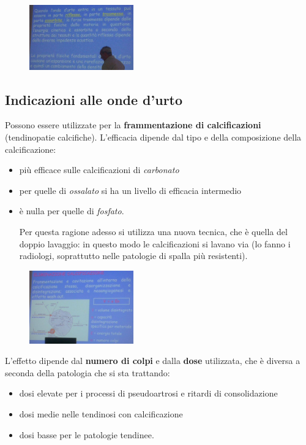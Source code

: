 \begin{figure}[!ht]
\centering
\includegraphics[width=0.4\textwidth]{025/image16.jpeg}
\end{figure}

\subsection{Indicazioni alle onde d'urto}

Possono essere utilizzate per la \textbf{frammentazione di
calcificazioni} (tendinopatie calcifiche). L'efficacia dipende dal tipo
e della composizione della calcificazione:

\begin{itemize}
\item
  più efficace sulle calcificazioni di \emph{carbonato}
\item
  per quelle di \emph{ossalato} si ha un livello di efficacia intermedio
\item
  è nulla per quelle di \emph{fosfato}.

Per questa ragione adesso si utilizza una nuova tecnica, che è quella
del doppio lavaggio: in questo modo le calcificazioni si lavano via (lo
fanno i radiologi, soprattutto nelle patologie di spalla più
resistenti).
\end{itemize}

\begin{figure}[!ht]
\centering
\includegraphics[width=0.4\textwidth]{025/image17.jpeg}
\end{figure}

L'effetto dipende dal \textbf{numero di colpi} e dalla \textbf{dose}
utilizzata, che è diversa a seconda della patologia che si sta
trattando:

\begin{itemize}
\item
  dosi elevate per i processi di pseudoartrosi e ritardi di
  consolidazione
\item
  dosi medie nelle tendinosi con calcificazione
\item
  dosi basse per le patologie tendinee.
\end{itemize}

